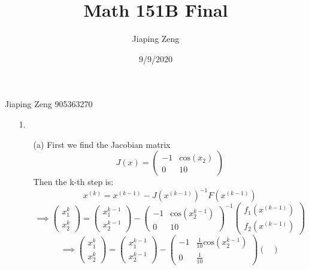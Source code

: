 \documentclass{article}
\title{Math 151B Final}
\author{Jiaping Zeng}
\date{9/9/2020}
\begin{document}

Jiaping Zeng 905363270

\newpage
\begin{itemize}
    \item [1.]
          \begin{itemize}
              \item [(a)] First we find the Jacobian matrix
                    \[J(x)=\begin{pmatrix}
                            -1 & \text{cos}(x_2) \\
                            0  & 10
                        \end{pmatrix}\]
                    Then the k-th step is:
                    \[x^{(k)}=x^{(k-1)}-J(x^{(k-1)})^{-1}F(x^{(k-1)})\]
                    \[\implies\begin{pmatrix}
                            x_1^k \\x_2^k
                        \end{pmatrix}=\begin{pmatrix}
                            x_1^{k-1} \\x_2^{k-1}
                        \end{pmatrix}-\begin{pmatrix}
                            -1 & \text{cos}(x_2^{k-1}) \\
                            0  & 10
                        \end{pmatrix}^{-1}\begin{pmatrix}
                            f_1(x^{(k-1)}) \\
                            f_2(x^{(k-1)})
                        \end{pmatrix}\]
                    \[\implies\begin{pmatrix}
                            x_1^k \\x_2^k
                        \end{pmatrix}=\begin{pmatrix}
                            x_1^{k-1} \\x_2^{k-1}
                        \end{pmatrix}-\begin{pmatrix}
                            -1 & \frac{1}{10}\text{cos}(x_2^{k-1}) \\
                            0  & \frac{1}{10}
                        \end{pmatrix}\begin{pmatrix}

\end{pmatrix}\]
\end{itemize}
\end{itemize}
\end{document}
